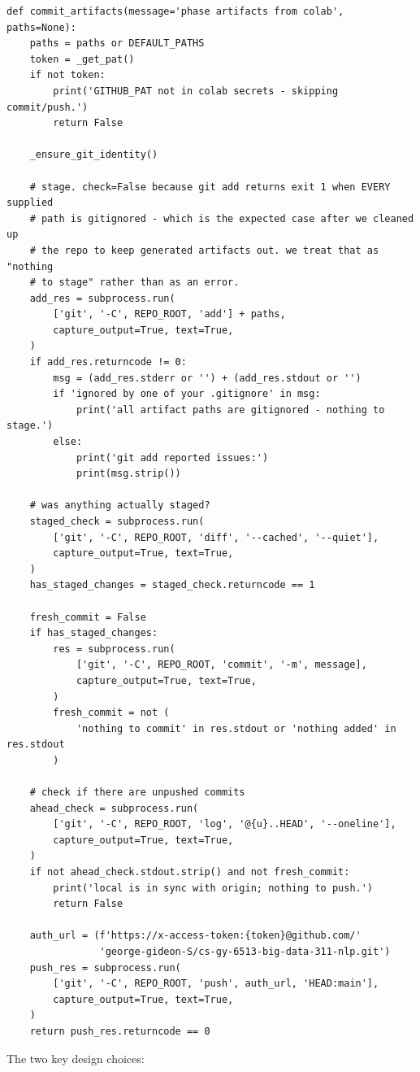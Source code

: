 \documentclass[11pt,letterpaper]{book}
\begin{document}
\begin{lstlisting}
def commit_artifacts(message='phase artifacts from colab', paths=None):
    paths = paths or DEFAULT_PATHS
    token = _get_pat()
    if not token:
        print('GITHUB_PAT not in colab secrets - skipping commit/push.')
        return False

    _ensure_git_identity()

    # stage. check=False because git add returns exit 1 when EVERY supplied
    # path is gitignored - which is the expected case after we cleaned up
    # the repo to keep generated artifacts out. we treat that as "nothing
    # to stage" rather than as an error.
    add_res = subprocess.run(
        ['git', '-C', REPO_ROOT, 'add'] + paths,
        capture_output=True, text=True,
    )
    if add_res.returncode != 0:
        msg = (add_res.stderr or '') + (add_res.stdout or '')
        if 'ignored by one of your .gitignore' in msg:
            print('all artifact paths are gitignored - nothing to stage.')
        else:
            print('git add reported issues:')
            print(msg.strip())

    # was anything actually staged?
    staged_check = subprocess.run(
        ['git', '-C', REPO_ROOT, 'diff', '--cached', '--quiet'],
        capture_output=True, text=True,
    )
    has_staged_changes = staged_check.returncode == 1

    fresh_commit = False
    if has_staged_changes:
        res = subprocess.run(
            ['git', '-C', REPO_ROOT, 'commit', '-m', message],
            capture_output=True, text=True,
        )
        fresh_commit = not (
            'nothing to commit' in res.stdout or 'nothing added' in res.stdout
        )

    # check if there are unpushed commits
    ahead_check = subprocess.run(
        ['git', '-C', REPO_ROOT, 'log', '@{u}..HEAD', '--oneline'],
        capture_output=True, text=True,
    )
    if not ahead_check.stdout.strip() and not fresh_commit:
        print('local is in sync with origin; nothing to push.')
        return False

    auth_url = (f'https://x-access-token:{token}@github.com/'
                'george-gideon-S/cs-gy-6513-big-data-311-nlp.git')
    push_res = subprocess.run(
        ['git', '-C', REPO_ROOT, 'push', auth_url, 'HEAD:main'],
        capture_output=True, text=True,
    )
    return push_res.returncode == 0
\end{lstlisting}

The two key design choices:
\end{document}
